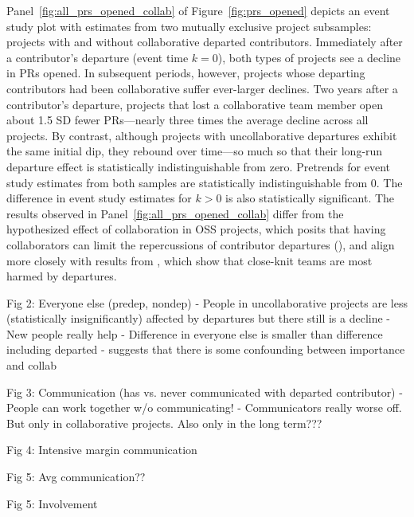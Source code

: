 \documentclass[12pt,notitlepage]{article}
\begin{document}
Panel~\ref{fig:all_prs_opened_collab} of Figure~\ref{fig:prs_opened} depicts an event study plot with estimates from two mutually exclusive project subsamples: projects with and without collaborative departed contributors. Immediately after a contributor’s departure (event time $k=0$), both types of projects see a decline in PRs opened. In subsequent periods, however, projects whose departing contributors had been collaborative suffer ever-larger declines. Two years after a contributor’s departure, projects that lost a collaborative team member open about 1.5 SD fewer PRs—nearly three times the average decline across all projects. By contrast, although projects with uncollaborative departures exhibit the same initial dip, they rebound over time—so much so that their long-run departure effect is statistically indistinguishable from zero. Pretrends for event study estimates from both samples are statistically indistinguishable from 0. The difference in event study estimates for $k>0$ is also statistically significant. The results observed in Panel~\ref{fig:all_prs_opened_collab} differ from the hypothesized effect of collaboration in OSS projects, which posits that having collaborators can limit the repercussions of contributor departures (\cite{rashid_systematic_2019}), and align more closely with results from \cite{jaravel_team-specific_2018}, which show that close-knit teams are most harmed by departures. 


Fig 2: Everyone else (predep, nondep) 
- People in uncollaborative projects are less (statistically insignificantly) affected by departures but there still is a decline
- New people really help
- Difference in everyone else is smaller than difference including departed - suggests that there is some confounding between importance and collab

Fig 3: Communication (has vs. never communicated with departed contributor)
- People can work together w/o communicating!
- Communicators really worse off. But only in collaborative projects. Also only in the long term???

Fig 4: Intensive margin communication

Fig 5: Avg communication??

Fig 5: Involvement
\end{document}
